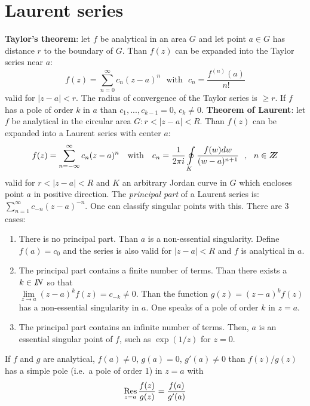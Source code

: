 \documentclass[twoside]{report}
\begin{document}
\section{Laurent series}
{\bf Taylor's theorem}: let $f$ be analytical in an area $G$ and let point
$a\in G$ has distance $r$ to the boundary of $G$. Than $f(z)$ can be expanded
into the Taylor series near $a$:
\[
f(z)=\sum_{n=0}^\infty c_n(z-a)^n~~~\mbox{with}~~~c_n=\frac{f^{(n)}(a)}{n!}
\]
valid for $|z-a|<r$. The radius of convergence of the Taylor series is $\geq r$.
If $f$ has a pole of order $k$ in $a$ than $c_1,...,c_{k-1}=0$, $c_k\neq0$.
\npar
{\bf Theorem of Laurent}: let $f$ be analytical in the circular area
$G:r<|z-a|<R$. Than $f(z)$ can be expanded into a Laurent series with center
$a$:
\[
f(z)=\sum_{n=-\infty}^\infty c_n(z-a)^n~~~\mbox{with}~~~
c_n=\frac{1}{2\pi i}\oint\limits_K\frac{f(w)dw}{(w-a)^{n+1}}~~,~~n\in Z\hspace{-1ex}Z
\]
valid for $r<|z-a|<R$ and $K$ an arbitrary Jordan curve in $G$ which encloses
point $a$ in positive direction.
\npar
The {\it principal part} of a Laurent series is: $\sum\limits_{n=1}^\infty c_{-n}(z-a)^{-n}$.
One can classify singular points with this. There are 3 cases:
\begin{enumerate}
\item There is no principal part. Than $a$ is a non-essential singularity.
      Define $f(a)=c_0$ and the series is also valid for $|z-a|<R$ and
      $f$ is analytical in $a$.
\item The principal part contains a finite number of terms. Than there exists
      a $k\in I\hspace{-1mm}N$ so that\\ $\lim\limits_{z\rightarrow a}(z-a)^kf(z)=c_{-k}\neq0$.
      Than the function $g(z)=(z-a)^kf(z)$ has a non-essential singularity in
      $a$. One speaks of a pole of order $k$ in $z=a$.
\item The principal part contains an infinite number of terms. Then, $a$ is an
      essential singular point of $f$, such as $\exp(1/z)$ for $z=0$.
\end{enumerate}
If $f$ and $g$ are analytical, $f(a)\neq0$, $g(a)=0$, $g'(a)\neq0$ than
$f(z)/g(z)$ has a simple pole (i.e.\ a pole of order 1) in $z=a$ with
\[
\mathop{\rm Res}\limits_{z=a}\frac{f(z)}{g(z)}=\frac{f(a)}{g'(a)}
\]
\end{document}
